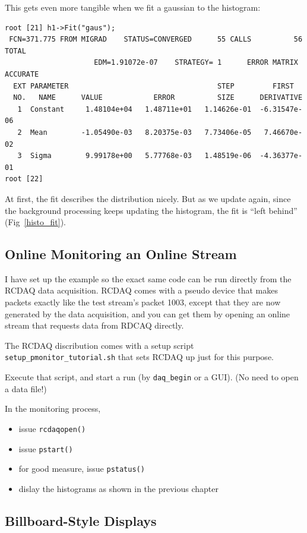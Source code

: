 \documentclass{article}[11pt]
\begin{document}
This gets even more tangible when we fit a gaussian to the histogram:

\begin{verbatim}
root [21] h1->Fit("gaus");
 FCN=371.775 FROM MIGRAD    STATUS=CONVERGED      55 CALLS          56 TOTAL
                     EDM=1.91072e-07    STRATEGY= 1      ERROR MATRIX ACCURATE
  EXT PARAMETER                                   STEP         FIRST
  NO.   NAME      VALUE            ERROR          SIZE      DERIVATIVE
   1  Constant     1.48104e+04   1.48711e+01   1.14626e-01  -6.31547e-06
   2  Mean        -1.05490e-03   8.20375e-03   7.73406e-05   7.46670e-02
   3  Sigma        9.99178e+00   5.77768e-03   1.48519e-06  -4.36377e-01
root [22]
\end{verbatim}

At first, the fit describes the distribution nicely. But as we update
again, since the background processing keeps updating the histogram, the
fit is ``left behind'' (Fig~\ref{histo_fit}).


\subsection{Online Monitoring an Online Stream}

I have set up the example so the exact same code can be run directly
from the RCDAQ data acquisition. RCDAQ comes with a pseudo device that
makes packets exactly like the test stream's packet 1003, except that
they are now generated by the data acquisition, and you can get them
by opening an online stream that requests data from RDCAQ directly.

The RCDAQ discribution comes with a setup script \verb|setup_pmonitor_tutorial.sh|
that sets RCDAQ up just for this purpose.

Execute that script, and start a run (by \verb|daq_begin| or a GUI).
(No need to open a data file!)


In the monitoring process,
\begin{itemize}
\item issue \verb|rcdaqopen()|
\item issue \verb|pstart()|
\item for good measure, issue \verb|pstatus()|
\item dislay the histograms as shown in the previous chapter
\end{itemize}



\subsection{Billboard-Style Displays}
\end{document}

